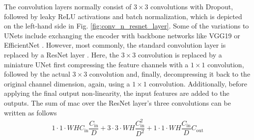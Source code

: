 The convolution layers normally consist of $3\times 3$ convolutions with Dropout, followed by leaky ReLU activations and batch normalization, which is depicted on the left-hand side in Fig. \ref{fig:conv_n_resnet_layer}. Some of the variations to UNets include exchanging the encoder with backbone networks like VGG19 \cite{simonyan2014very,wulff2018early} or EfficientNet \cite{tan2019efficientnet,philion2020lift}. However, most commonly, the standard convolution layer is replaced by a ResNet layer \cite{he2016deep,wirges2018evidential,reiher2020sim2real,roddick2020predicting,philion2020lift}. Here, the $3 \times 3$ convolution is replaced by a miniature UNet first compressing the feature channels with a $1\times 1$ convolution, followed by the actual $3 \times 3$ convolution and, finally, decompressing it back to the original channel dimension, again, using a $1 \times 1$ convolution. Additionally, before applying the final output non-linearity, the input features are added to the outputs. The sum of \gls{mac} over the ResNet layer's three convolutions can be written as follows
\begin{align}
	1\cdot 1\cdot WHC_{\text{in}}\dfrac{C_{\text{in}}}{D} + 3\cdot 3\cdot WH\dfrac{C_{\text{in}}^2}{D^2} +1\cdot 1\cdot WH\dfrac{C_{\text{in}}}{D}C_{\text{out}}
\end{align} 

